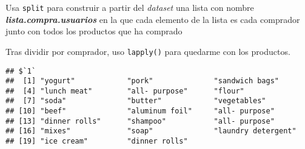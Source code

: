 \documentclass[
  ignorenonframetext,
]{beamer}
\newenvironment{Shaded}{\begin{snugshade}}{\end{snugshade}}
\newcommand{\ControlFlowTok}[1]{\textcolor[rgb]{0.13,0.29,0.53}{\textbf{#1}}}
\newcommand{\DecValTok}[1]{\textcolor[rgb]{0.00,0.00,0.81}{#1}}
\newcommand{\KeywordTok}[1]{\textcolor[rgb]{0.13,0.29,0.53}{\textbf{#1}}}
\newcommand{\NormalTok}[1]{#1}
\newcommand{\OperatorTok}[1]{\textcolor[rgb]{0.81,0.36,0.00}{\textbf{#1}}}
\newcommand{\StringTok}[1]{\textcolor[rgb]{0.31,0.60,0.02}{#1}}
\begin{document}
\begin{frame}[fragile]{Usa \texttt{split} para construir a partir del
\emph{dataset} una lista con nombre
\textbf{\emph{lista.compra.usuarios}} en la que cada elemento de la
lista es cada comprador junto con todos los productos que ha comprado}
\protect\hypertarget{usa-split-para-construir-a-partir-del-dataset-una-lista-con-nombre-lista.compra.usuarios-en-la-que-cada-elemento-de-la-lista-es-cada-comprador-junto-con-todos-los-productos-que-ha-comprado}{}

Tras dividir por comprador, uso \texttt{lapply()} para quedarme con los
productos.

\begin{Shaded}
\end{Shaded}

\begin{verbatim}
## $`1`
##  [1] "yogurt"            "pork"              "sandwich bags"    
##  [4] "lunch meat"        "all- purpose"      "flour"            
##  [7] "soda"              "butter"            "vegetables"       
## [10] "beef"              "aluminum foil"     "all- purpose"     
## [13] "dinner rolls"      "shampoo"           "all- purpose"     
## [16] "mixes"             "soap"              "laundry detergent"
## [19] "ice cream"         "dinner rolls"
\end{verbatim}

\end{frame}
\end{document}
